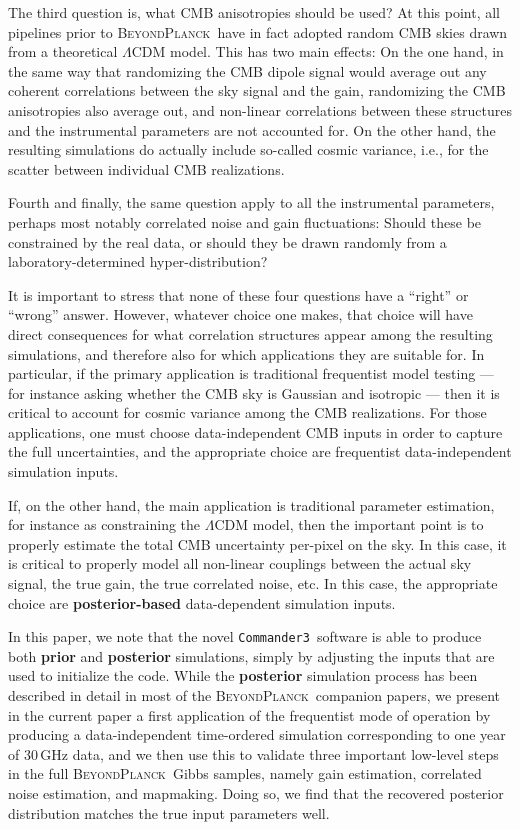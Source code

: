 \documentclass[twocolumn]{aa}%
\def\commanderthree{\texttt{Commander3}}
\newcommand{\BP}{\textsc{BeyondPlanck}}
\begin{document}
The third question is, what CMB anisotropies should be used? At this
point, all pipelines prior to \BP\ have in fact adopted random CMB
skies drawn from a theoretical $\Lambda$CDM model. This has two main
effects: On the one hand, in the same way that randomizing the CMB
dipole signal would average out any coherent correlations between the
sky signal and the gain, randomizing the CMB anisotropies also average
out, and non-linear correlations between these structures and the
instrumental parameters are not accounted for. On the other hand, the
resulting simulations do actually include so-called cosmic variance,
i.e., for the scatter between individual CMB realizations.

Fourth and finally, the same question apply to all the instrumental
parameters, perhaps most notably correlated noise and gain
fluctuations: Should these be constrained by the real data, or should
they be drawn randomly from a laboratory-determined
hyper-distribution? 

It is important to stress that none of these four questions have a
``right'' or ``wrong'' answer. However, whatever choice one makes,
that choice will have direct consequences for what correlation
structures appear among the resulting simulations, and therefore also
for which applications they are suitable for. In particular, if the
primary application is traditional frequentist model testing --- for
instance asking whether the CMB sky is Gaussian and isotropic --- then
it is critical to account for cosmic variance among the CMB
realizations. For those applications, one must choose data-independent
CMB inputs in order to capture the full uncertainties, and the
appropriate choice are frequentist data-independent simulation inputs.

If, on the other hand, the main application is traditional parameter
estimation, for instance as constraining the $\Lambda$CDM model, then
the important point is to properly estimate the total CMB uncertainty per-pixel on the sky. In this case, it is
critical to properly model all non-linear couplings between the actual
sky signal, the true gain, the true correlated noise, etc. In this
case, the appropriate choice are {\bf posterior-based} data-dependent simulation
inputs.

In this paper, we note that the novel \commanderthree\ software is
able to produce both {\bf prior} and {\bf posterior} simulations, simply by
adjusting the inputs that are used to initialize the code. While the
{\bf posterior} simulation process has been described in detail in most of
the \BP\ companion papers, we present in the current paper a first
application of the frequentist mode of operation by producing a
data-independent time-ordered simulation corresponding to one year of
30\,GHz data, and we then use this to validate three important
low-level steps in the full \BP\ Gibbs samples, namely gain
estimation, correlated noise estimation, and mapmaking. Doing so, we
find that the recovered posterior distribution matches the true input
parameters well.






%

\end{document}
